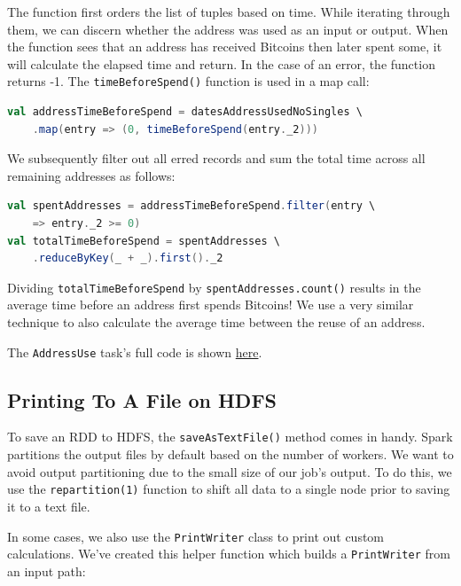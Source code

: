 \documentclass[9pt,twocolumn,twoside]{idsi}
\begin{document}
The function first orders the list of tuples based on time. While iterating through them, we can discern whether the address was used as an input or output. When the function sees that an address has received Bitcoins then later spent some, it will calculate the elapsed time and return. In the case of an error, the function returns -1. The \lstinline{timeBeforeSpend()} function is used in a map call:

\begin{lstlisting}[language=Scala]
val addressTimeBeforeSpend = datesAddressUsedNoSingles \
    .map(entry => (0, timeBeforeSpend(entry._2)))
\end{lstlisting}

We subsequently filter out all erred records and sum the total time across all remaining addresses as follows:

\begin{lstlisting}[language=Scala]
val spentAddresses = addressTimeBeforeSpend.filter(entry \
    => entry._2 >= 0)
val totalTimeBeforeSpend = spentAddresses \
    .reduceByKey(_ + _).first()._2
\end{lstlisting}

Dividing \lstinline{totalTimeBeforeSpend} by \lstinline{spentAddresses.count()} results in the average time before an address first spends Bitcoins! We use a very similar technique to also calculate the average time between the reuse of an address.

The \lstinline{AddressUse} task's full code is shown \href{https://github.com/nishilshah17/idsi_bitcoin/blob/44ec93f337bdf620b56f4343650f2a572aca2cb4/analyze_blockchain/src/main/scala/AddressUse.scala}{here}.

\subsection{Printing To A File on HDFS}

To save an RDD to HDFS, the \lstinline{saveAsTextFile()} method comes in handy. Spark partitions the output files by default based on the number of workers. We want to avoid output partitioning due to the small size of our job's output. To do this, we use the \lstinline{repartition(1)} function to shift all data to a single node prior to saving it to a text file.

In some cases, we also use the \lstinline{PrintWriter} class to print out custom calculations. We've created this helper function which builds a \lstinline{PrintWriter} from an input path:
\end{document}
